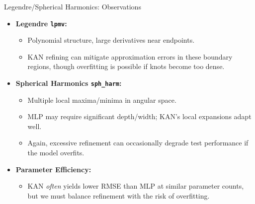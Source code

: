 \documentclass{beamer}
\begin{document}
\begin{frame}{Legendre/Spherical Harmonics: Observations}
  \begin{itemize}
    \item \textbf{Legendre \texttt{lpmv}:}
      \begin{itemize}
        \item Polynomial structure, large derivatives near endpoints.
        \item KAN refining can mitigate approximation errors in these boundary regions, though overfitting is possible if knots become too dense.
      \end{itemize}
    \item \textbf{Spherical Harmonics \texttt{sph\_harm}:}
      \begin{itemize}
        \item Multiple local maxima/minima in angular space.
        \item MLP may require significant depth/width; KAN’s local expansions adapt well. 
        \item Again, excessive refinement can occasionally degrade test performance if the model overfits.
      \end{itemize}
    \item \textbf{Parameter Efficiency:}
      \begin{itemize}
        \item KAN \emph{often} yields lower RMSE than MLP at similar parameter counts, but we must balance refinement with the risk of overfitting.
      \end{itemize}
  \end{itemize}
\end{frame}
\end{document}

